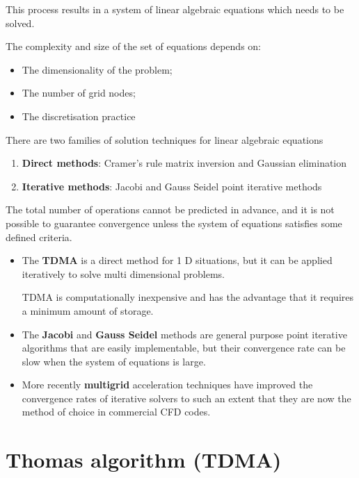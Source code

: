 \documentclass[a4paper, 15pt]{article}
\begin{document}
This
process results in a system of linear algebraic equations which needs to be solved.\newline 

The
complexity and size of the set of equations depends on:
\begin{itemize}
	\item The
	dimensionality of the problem;
	\item The
	number of grid nodes;
	\item The
	discretisation practice
\end{itemize}

There
are two families of solution techniques for linear algebraic equations
\begin{enumerate}
	\item \textbf{Direct methods}: Cramer’s rule matrix inversion and Gaussian elimination
	
	\item \textbf{Iterative methods}: Jacobi and Gauss Seidel point iterative methods
\end{enumerate}

The
total number of operations cannot be predicted in advance, and it is not possible to
guarantee convergence unless the system of equations satisfies some defined criteria. \newline 

\begin{itemize}
	\item The
	\textbf{TDMA} is a direct method for 1 D situations, but it can be applied iteratively to solve multi
	dimensional problems. 
	
	TDMA
	is computationally inexpensive and has the advantage that it requires a minimum amount
	of storage. 
	
	\item The
	\textbf{Jacobi} and \textbf{Gauss Seidel} methods are general purpose point iterative algorithms that are
	easily implementable, but their convergence rate can be slow when the system of equations is
	large. 
	
	\item More recently \textbf{multigrid} acceleration techniques have improved the convergence rates
	of iterative solvers to such an extent that they are now the method of choice in commercial CFD
	codes. 
\end{itemize}



\section{Thomas algorithm (TDMA)}
\end{document}
